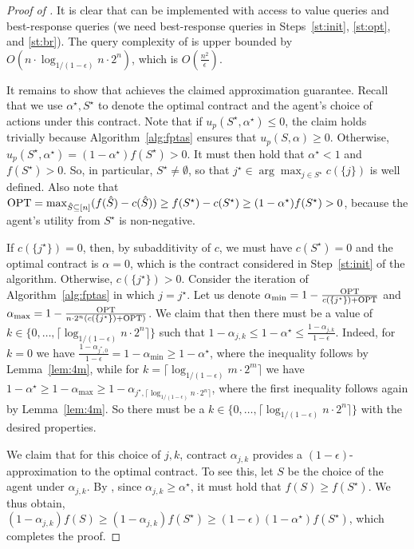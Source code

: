 \documentclass[11pt]{article}
\begin{document}
\begin{proof}[Proof of ]
It is clear that  can be implemented with access to  value queries and best-response queries (we need best-response queries in Steps~\ref{st:init}, \ref{st:opt}, and \ref{st:br}). The query complexity of  is upper bounded by $O(n \cdot \log_{1/(1-\epsilon)}n\cdot 2^n)$, which is $O(\frac{n^2}{\epsilon})$. 

It remains to show that  achieves the claimed approximation guarantee.
Recall that we use $\alpha^\star,S^\star$ to denote the optimal contract and the agent's choice of actions under this contract. Note that if $u_p(S^\star,\alpha^\star) \leq 0$, the claim holds trivially because Algorithm~\ref{alg:fptas} ensures that $u_p(S, \alpha) \geq 0$. Otherwise, $u_p(S^\star,\alpha^\star) = (1-\alpha^\star)f(S^\star) > 0$. It must then hold that $\alpha^\star < 1$ and $f(S^\star) > 0$. 
So, in particular, $S^\star \neq \emptyset$, so that $j^\star \in \arg\max_{j \in S^\star} c(\{j\})$ is well defined.  Also note that $\text{OPT} = \max_{\hat{S} \subseteq [n]} (f(\hat{S}) - c(\hat{S})) \geq f(S^\star) - c(S^\star) \geq (1-\alpha^\star) f(S^\star) >0$, because the agent's utility from $S^\star$ is non-negative. 

If $c(\{j^\star\})=0$, then, by subadditivity of $c$, we must have $c(S^\star) = 0$ and the optimal contract is $\alpha=0$, which is the contract considered in Step~\ref{st:init} of the algorithm. 
Otherwise, $c(\{j^\star\}) > 0$. Consider the iteration of Algorithm~\ref{alg:fptas} in which $j = j^\star$.
Let us denote $\alpha_{\min} =1- \frac{\text{OPT}}{ c(\{j^\star\}) + \text{OPT}}$ and $\alpha_{\max} = 1- \frac{\text{OPT}}{n\cdot 2^n (c(\{j^\star\}) + \text{OPT} )}$.
We claim that then there must be a value of  $k \in \{0,\ldots,\lceil \log_{1/(1-\epsilon)} n\cdot 2^n \rceil\}$ such that $1 - \alpha_{j, k}  \leq 1 - \alpha^\star \leq  \frac{1 - \alpha_{j, k}}{1-\epsilon}$.
Indeed, for $k = 0$ we have $\frac{1-\alpha_{j^\star,0}}{1-\epsilon} =  1- \alpha_{\min} \geq  1-\alpha^\star$, where the inequality follows by Lemma~\ref{lem:4m}, while for $k =\lceil \log_{1/(1-\epsilon)}m\cdot 2^m \rceil$ we have $1-\alpha^\star \geq 1- \alpha_{\max} \geq 1-\alpha_{j^\star,\lceil \log_{1/(1-\epsilon)}n\cdot 2^n \rceil}$, where the first inequality follows again by Lemma~\ref{lem:4m}. So there must be a $k \in \{0,\ldots,\lceil \log_{1/(1-\epsilon)}n \cdot 2^n \rceil\}$ with the desired properties.

We claim that for this choice of $j,k$, contract $\alpha_{j, k}$ provides a $(1-\epsilon)$-approximation to the optimal contract.
To see this, let $S$ be the choice of the agent under $\alpha_{j, k}$.
By , since $\alpha_{j, k} \geq \alpha^\star$, it must hold that $f(S) \geq f(S^\star)$. We thus obtain,
$(1-\alpha_{j, k}) f(S) \geq (1-\alpha_{j, k}) f(S^\star) \geq  (1-\epsilon)(1-\alpha^\star) f(S^\star)$,
which completes the proof.
\end{proof}
\end{document}
